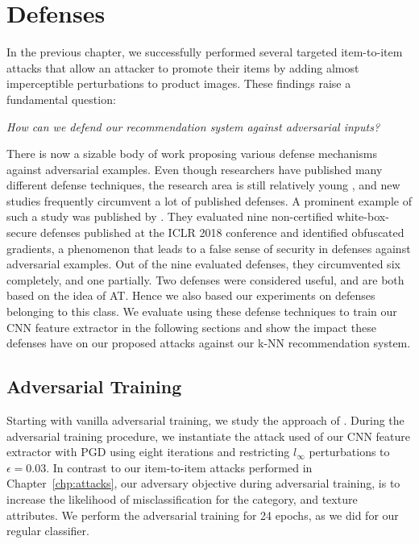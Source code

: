 \chapter{Defenses}
\label{chp:defenses}
In the previous chapter, we successfully performed several targeted item-to-item attacks that allow an attacker to promote their items by adding almost imperceptible perturbations to product images. These findings raise a fundamental question:
\begin{center}
	\textit{How can we defend our recommendation system against adversarial inputs?}
\end{center} 
There is now a sizable body of work proposing various defense mechanisms against adversarial examples. Even though researchers have published many different defense techniques, the research area is still relatively young \parencite{szegedy2013intriguing}, and new studies frequently circumvent a lot of published defenses. A prominent example of such a study was published by \cite{athalye2018obfuscated}. They evaluated nine non-certified white-box-secure defenses published at the ICLR 2018 conference and identified obfuscated gradients, a phenomenon that leads to a false sense of security in defenses against adversarial examples. Out of the nine evaluated defenses, they circumvented six completely, and one partially. Two defenses were considered useful, and are both based on the idea of \ac{AT}. Hence we also based our experiments on defenses belonging to this class. We evaluate using these defense techniques to train our \ac{CNN} feature extractor in the following sections and show the impact these defenses have on our proposed attacks against our \ac{k-NN} recommendation system. 

\section{Adversarial Training}
Starting with vanilla adversarial training, we study the approach of \cite{madry2017towards}. During the adversarial training procedure, we instantiate the attack used of our \ac{CNN} feature extractor with \ac{PGD} using eight iterations and restricting $l_\infty$ perturbations to $\epsilon=0.03$. In contrast to our item-to-item attacks performed in Chapter~\ref{chp:attacks}, our adversary objective during adversarial training, is to increase the likelihood of misclassification for the category, and texture attributes. We perform the adversarial training for 24 epochs, as we did for our regular classifier. 

